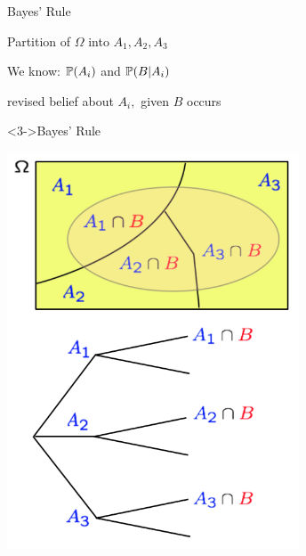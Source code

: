 \begin{frame}{Bayes' Rule}

{
\plitemsep 0.1in

\bci
\item Partition of $\Omega$ into $A_1,A_2,A_3$

\item We know: $\mathbb{P}( A_i )$ and $\mathbb{P}( B | A_i )$ 

\item<2-> 

\item<2-> revised belief about $A_i,$ given $B$ occurs

\begin{block}<3->{Bayes' Rule}
\end{block}

\eci 
}
{
\centering
\includegraphics[width=0.65\textwidth]{L2_total_ex.png}
}

\end{frame}

